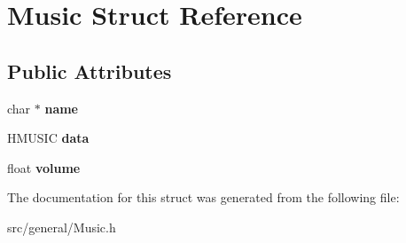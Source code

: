 \hypertarget{struct_music}{}\section{Music Struct Reference}
\label{struct_music}
\subsection*{Public Attributes}
\begin{DoxyCompactItemize}
\item 
\mbox{\label{struct_music_a4833f015994e7ce55380973e1ea7bc69}} 
char $\ast$ {\bfseries name}
\item 
\mbox{\label{struct_music_acb4f421c04db3a19b8249ce0def2c758}} 
H\+M\+U\+S\+IC {\bfseries data}
\item 
\mbox{\label{struct_music_a4d41d224a8a4aa4c0fc7c0bd91cd268d}} 
float {\bfseries volume}
\end{DoxyCompactItemize}


The documentation for this struct was generated from the following file\+:\begin{DoxyCompactItemize}
\item 
src/general/Music.\+h\end{DoxyCompactItemize}
